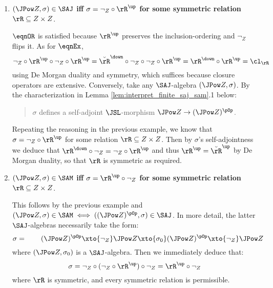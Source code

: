 \documentclass{article}
\begin{document}
\begin{example}
\begin{enumerate}
  \smallskip

  \item
  {\bf $(\JPow Z,\sigma) \in \SAJ$ iff $\sigma = \neg_Z \circ \rR^\up$ for some symmetric relation $\rR \subseteq Z \times Z$}.
  
  \smallskip
  $\eqnOR$ is satisfied because $\rR^\up$ preserves the inclusion-ordering and $\neg_Z$ flips it. As for $\eqnEx$,
  \[
  \neg_Z \circ \rR^\up \circ \neg_Z \circ \rR^\up
  = \breve{\rR}^\down \circ \neg_Z \circ \neg_Z \circ \rR^\up
  = \rR^\down \circ \rR^\up
  = \cl_\rR
  \]
  using De Morgan duality and symmetry, which suffices because closure operators are extensive. Conversely, take any $\SAJ$-algebra $(\JPow Z,\sigma)$. By the characterization in Lemma \ref{lem:interpret_finite_saj_sam}.1 below:
  \begin{quote}
  $\sigma$ defines a self-adjoint $\JSL$-morphism $\JPow Z \to (\JPow Z)^{\pOp}$.
  \end{quote}
  Repeating the reasoning in the previous example, we know that $\sigma = \neg_Z \circ \rR^\up$ for some relation $\rR \subseteq Z \times Z$. Then by $\sigma$'s self-adjointness we deduce that $\rR^\down \circ \neg_Z = \neg_Z \circ \rR^\up$ and thus $\rR^\up = \breve{\rR}^\up$ by De Morgan duality, so that $\rR$ is symmetric as required.
  
  \smallskip

  \item
  {\bf $(\JPow Z,\sigma) \in \SAM$ iff $\sigma = \rR^\up \circ \neg_Z$ for some symmetric relation $\rR \subseteq Z \times Z$}.
  
  \smallskip
  This follows by the previous example and $(\JPow Z,\sigma) \in \SAM \iff ((\JPow Z)^{\pOp},\sigma) \in \SAJ$. In more detail, the latter $\SAJ$-algebras necessarily take the form:
  \[
  \sigma = \qquad (\JPow Z)^{\pOp} \xto{\neg_Z} \JPow Z \xto{\sigma_0} (\JPow Z)^{\pOp} \xto{\neg_Z} \JPow Z
  \]
  where $(\JPow Z,\sigma_0)$ is a $\SAJ$-algebra. Then we immediately deduce that:
  \[
  \sigma
  = \neg_Z \circ (\neg_Z \circ \rR^\up) \circ \neg_Z
  = \rR^\up \circ \neg_Z
  \]
  where $\rR$ is symmetric, and every symmetric relation is permissible.
  

\end{enumerate}
\end{example}
\end{document}
